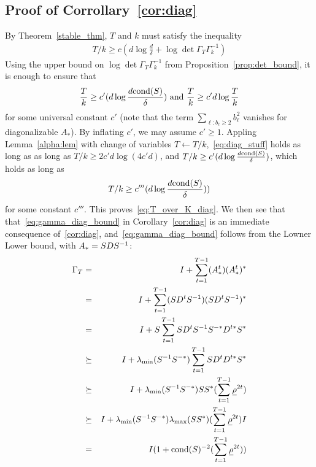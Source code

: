\subsection{Proof of Corrollary~\ref{cor:diag}}
By Theorem~\ref{stable_thm}, $T$ and $k$ must satisfy the inequality
\begin{eqnarray*}
T/k \ge c(d \log \frac{d}{\delta} + \log \det \Gamma_{T}\Gamma_{k}^{-1}) 
\end{eqnarray*}
Using the upper bound on $\log \det \Gamma_T \Gamma_k^{-1}$ from Proposition~\ref{prop:det_bound}, it is enough to ensure that 
\begin{eqnarray}\label{eq:diag_stuff}
\frac{T}{k} \ge c'(d \log \frac{d\mathrm{cond}(S)}{\delta}) \text{ and } \frac{T}{k} \ge c' d \log \frac{T}{k}
\end{eqnarray}
for some universal constant $c'$ (note that the term $\sum_{\ell: b_{\ell} \ge 2} b_{\ell}^2$ vanishes for diagonalizable $A_*$). By inflating $c'$, we may assume $c' \ge 1$. Appling Lemma~\ref{alpha:lem} with change of variables $T \leftarrow T/k$,~\eqref{eq:diag_stuff} holds as long as as long as $T/k \ge 2c' d \log(4 c' d)$, and $T/k \ge c'(d \log \frac{d\mathrm{cond}(S)}{\delta})$, which holds as long as
\begin{eqnarray*}
T/k \ge c'''(d \log \frac{d\mathrm{cond}(S)}{\delta})) 
\end{eqnarray*}
for some constant $c'''$. This proves~\eqref{eq:T_over_K_diag}. We then see that that~\eqref{eq:gamma_diag_bound} in Corollary~\ref{cor:diag} is an immediate consequence of~\ref{cor:diag}, and~\eqref{eq:gamma_diag_bound} follows from the Lowner Lower bound, with $A_{*} = SDS^{-1}$:
\begin{eqnarray*}
\Gamma_T &=& I + \sum_{t=1}^{T-1} (A_{*}^t)(A_{*}^t)^{*}\\
&=& I + \sum_{t=1}^{T-1} (SD^tS^{-1})(SD^tS^{-1})^{*}\\
&=& I + S\sum_{t=1}^{T-1} SD^tS^{-1}S^{-*}D^{t*}S^{*}\\
&\succeq& I + \lambda_{\min}(S^{-1}S^{-*})\sum_{t=1}^{T-1} SD^tD^{t*}S^{*}\\
&\succeq& I + \lambda_{\min}(S^{-1}S^{-*})SS^{*}(\sum_{t=1}^{T-1} \underline{\rho}^{2t})\\
&\succeq& I + \lambda_{\min}(S^{-1}S^{-*})\lambda_{\max}(SS^{*})(\sum_{t=1}^{T-1} \underline{\rho}^{2t})I\\
&=& I(1+\mathrm{cond}(S)^{-2}(\sum_{t=1}^{T-1} \underline{\rho}^{2t}))
\end{eqnarray*}





